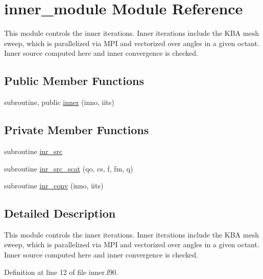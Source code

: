 \hypertarget{classinner__module}{\section{inner\-\_\-module Module Reference}
\label{classinner__module}
}


This module controls the inner iterations. Inner iterations include the K\-B\-A mesh sweep, which is parallelized via M\-P\-I and vectorized over angles in a given octant. Inner source computed here and inner convergence is checked.  


\subsection*{Public Member Functions}
\begin{DoxyCompactItemize}
\item 
subroutine, public \hyperlink{classinner__module_a350653dec40b4e680597662f0f71152a}{inner} (inno, iits)
\end{DoxyCompactItemize}
\subsection*{Private Member Functions}
\begin{DoxyCompactItemize}
\item 
subroutine \hyperlink{classinner__module_a54814aa404076eeef0878195e857c6dc}{inr\-\_\-src}
\item 
subroutine \hyperlink{classinner__module_ab4e7dc903de165ff491549c87e4d886b}{inr\-\_\-src\-\_\-scat} (qo, cs, f, fm, q)
\item 
subroutine \hyperlink{classinner__module_aedc12f5460b9dd44814f2bd38158cc60}{inr\-\_\-conv} (inno, iits)
\end{DoxyCompactItemize}


\subsection{Detailed Description}
This module controls the inner iterations. Inner iterations include the K\-B\-A mesh sweep, which is parallelized via M\-P\-I and vectorized over angles in a given octant. Inner source computed here and inner convergence is checked. 

Definition at line 12 of file inner.\-f90.



